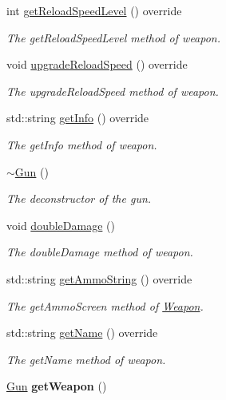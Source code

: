 \begin{DoxyCompactItemize}
int \hyperlink{class_gun_aa4625cb9f717925e0416d38ae02db057}{get\+Reload\+Speed\+Level} () override
\begin{DoxyCompactList}\small\item\em The get\+Reload\+Speed\+Level method of weapon. \end{DoxyCompactList}\item 
void \hyperlink{class_gun_a88408d572350474609c2fc294a6b807b}{upgrade\+Reload\+Speed} () override
\begin{DoxyCompactList}\small\item\em The upgrade\+Reload\+Speed method of weapon. \end{DoxyCompactList}\item 
std\+::string \hyperlink{class_gun_a95d46c82be65c2552f3386f561e53bfb}{get\+Info} () override
\begin{DoxyCompactList}\small\item\em The get\+Info method of weapon. \end{DoxyCompactList}\item 
\hyperlink{class_gun_af107f78d608720fef712c14b148afcdd}{$\sim$\+Gun} ()
\begin{DoxyCompactList}\small\item\em The deconstructor of the gun. \end{DoxyCompactList}\item 
void \hyperlink{class_gun_a62ab15432407b2396c86d35264ea8a5b}{double\+Damage} ()
\begin{DoxyCompactList}\small\item\em The double\+Damage method of weapon. \end{DoxyCompactList}\item 
std\+::string \hyperlink{class_gun_a6c38ebbaf4b538bda73538c4125c663c}{get\+Ammo\+String} () override
\begin{DoxyCompactList}\small\item\em The get\+Ammo\+Screen method of \hyperlink{class_weapon}{Weapon}. \end{DoxyCompactList}\item 
std\+::string \hyperlink{class_gun_a7230d075015f04e59822b9078719c5d7}{get\+Name} () override
\begin{DoxyCompactList}\small\item\em The get\+Name method of weapon. \end{DoxyCompactList}\item 
\hypertarget{class_gun_a86d8b628b6ea7038834ce538bea5cf9b}{\hyperlink{class_gun}{Gun} {\bfseries get\+Weapon} ()}\label{class_gun_a86d8b628b6ea7038834ce538bea5cf9b}


\end{DoxyCompactItemize}
